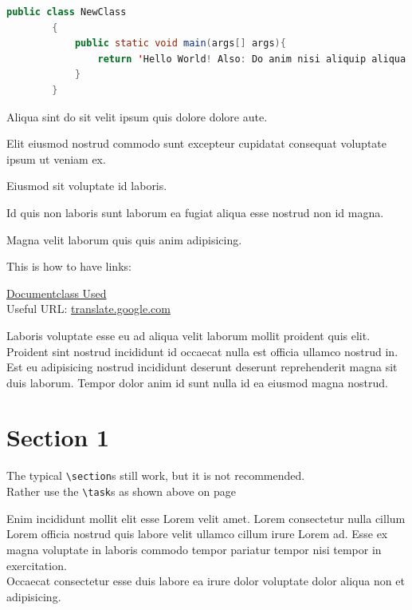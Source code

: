 \documentclass
    [   %
        repeatauthor,           %
        shorttitle,             %
        a4paper                 %
    ]{uhhassignment}
\begin{document}
\begin{minipage}{\textwidth}
    \begin{lstlisting}[language = Java, firstnumber = last]
        public class NewClass 
        {
            public static void main(args[] args){
                return 'Hello World! Also: Do anim nisi aliquip aliqua aliqua fugiat nostrud occaecat ex dolore sit. Cupidatat exercitation ipsum velit magna qui ea aliquip reprehenderit.';
            }
        }
    \end{lstlisting}
\end{minipage}

Aliqua sint do sit velit ipsum quis dolore dolore aute.

Elit eiusmod nostrud commodo sunt excepteur cupidatat consequat voluptate ipsum ut veniam ex.

Eiusmod sit voluptate id laboris.

Id quis non laboris sunt laborum ea fugiat aliqua esse nostrud non id magna.

Magna velit laborum quis quis anim adipisicing. 

This is how to have links:

\href{https://ftp.cc.uoc.gr/mirrors/CTAN/macros/latex/contrib/uhhassignment/uhhassignment.pdf}{Documentclass Used}\\
Useful URL: \url{translate.google.com}\\

Laboris voluptate esse eu ad aliqua velit laborum mollit proident quis elit.\\
Proident sint nostrud incididunt id occaecat nulla est officia ullamco nostrud in. 
Est eu adipisicing nostrud incididunt deserunt deserunt reprehenderit magna sit duis laborum. 
Tempor dolor anim id sunt nulla id ea eiusmod magna nostrud.





\newpage
\section{Section 1}
The typical \texttt{\textbackslash section}s still work, but it is not recommended.\\
Rather use the \texttt{\textbackslash task}s as shown above on page \pageref{tsk: Task1}

Enim incididunt mollit elit esse Lorem velit amet. 
Lorem consectetur nulla cillum Lorem officia nostrud quis labore velit ullamco cillum irure Lorem ad. 
Esse ex magna voluptate in laboris commodo tempor pariatur tempor nisi tempor in exercitation.\\
Occaecat consectetur esse duis labore ea irure dolor voluptate dolor aliqua non et adipisicing.
\end{document}
